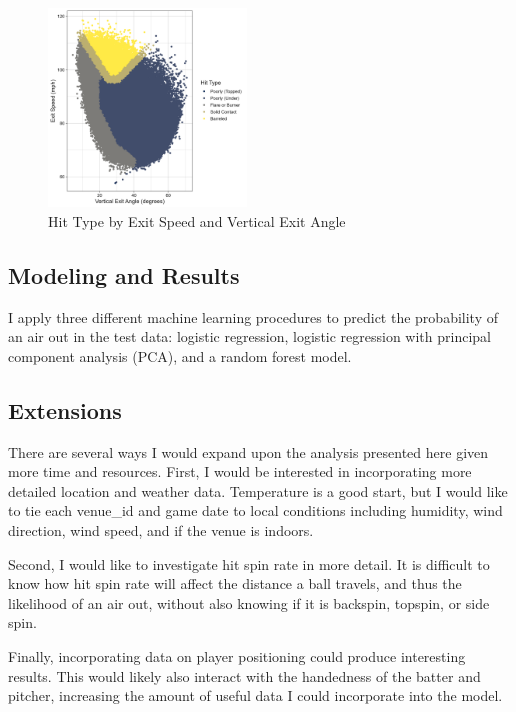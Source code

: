 \begin{figure}[htb]
  \includegraphics[width = 0.47\textwidth]{../../output/figs/barreled.png}
  \caption{Hit Type by Exit Speed and Vertical Exit Angle}
  \label{fig:barreled}
\end{figure}

\subsection{Modeling and Results}
\label{subsec:model}

I apply three different machine learning procedures to predict the probability of an air out in the test data: logistic regression, logistic regression with principal component analysis (PCA), and a random forest model.

\subsection{Extensions}
\label{subsec:results}

There are several ways I would expand upon the analysis presented here given more time and resources. First, I would be interested in incorporating more detailed location and weather data. Temperature is a good start, but I would like to tie each venue\_id and game date to local conditions including humidity, wind direction, wind speed, and if the venue is indoors.

Second, I would like to investigate hit spin rate in more detail. It is difficult to know how hit spin rate will affect the distance a ball travels, and thus the likelihood of an air out, without also knowing if it is backspin, topspin, or side spin.

Finally, incorporating data on player positioning could produce interesting results. This would likely also interact with the handedness of the batter and pitcher, increasing the amount of useful data I could incorporate into the model.